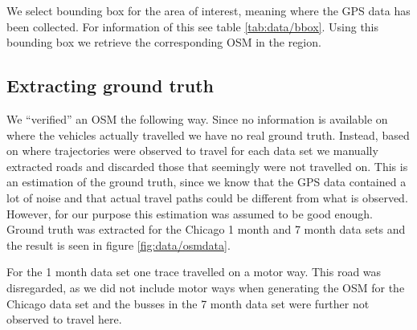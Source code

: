 We select bounding box for the area of interest, meaning where the \ac{GPS} data has been collected. For information of this see table \ref{tab:data/bbox}. Using this bounding box we retrieve the corresponding \ac{OSM} in the region. 

\subsection{Extracting ground truth}
\label{chp:data.sec:osm.sec:gt}

We ``verified'' an \ac{OSM} the following way. Since no information is available on where the vehicles actually travelled we have no real ground truth. Instead, based on where trajectories were observed to travel for each data set we manually extracted roads and discarded those that seemingly were not travelled on. This is an estimation of the ground truth, since we know that the \ac{GPS} data contained a lot of noise and that actual travel paths could be different from what is observed. However, for our purpose this estimation was assumed to be good enough. Ground truth was extracted for the Chicago 1 month and 7 month data sets and the result is seen in figure \ref{fig:data/osmdata}.

For the 1 month data set one trace travelled on a motor way. This road was disregarded, as we did not include motor ways when generating the \ac{OSM} for the Chicago data set and the busses in the 7 month data set were further not observed to travel here. 

